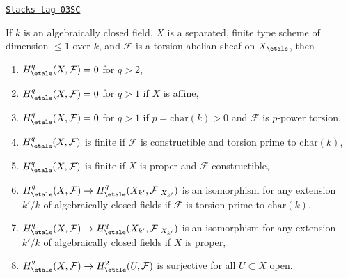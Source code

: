 \begin{theorem}
\label{etale-cohomology-theorem-vanishing-affine-curves}
\href{https://stacks.math.columbia.edu/tag/03SC}{\texttt{Stacks tag 03SC}}

If $k$ is an algebraically closed field, $X$ is a separated, finite type
scheme of dimension $\leq 1$ over $k$, and $\mathcal{F}$ is a torsion
abelian sheaf on $X_\etale$, then
\begin{enumerate}
\item
$H^q_\etale(X, \mathcal{F}) = 0$ for $q > 2$,
\item
$H^q_\etale(X, \mathcal{F}) = 0$ for $q > 1$ if $X$ is affine,
\item
$H^q_\etale(X, \mathcal{F}) = 0$ for $q > 1$ if $p = \text{char}(k) > 0$
and $\mathcal{F}$ is $p$-power torsion,
\item
$H^q_\etale(X, \mathcal{F})$ is finite if $\mathcal{F}$ is
constructible and torsion prime to $\text{char}(k)$,
\item
$H^q_\etale(X, \mathcal{F})$ is finite if $X$ is proper and
$\mathcal{F}$ constructible,
\item
$H^q_\etale(X, \mathcal{F}) \to
H^q_\etale(X_{k'}, \mathcal{F}|_{X_{k'}})$ is an isomorphism
for any extension $k'/k$ of algebraically closed fields
if $\mathcal{F}$ is torsion prime to $\text{char}(k)$,
\item
$H^q_\etale(X, \mathcal{F}) \to
H^q_\etale(X_{k'}, \mathcal{F}|_{X_{k'}})$ is an isomorphism
for any extension $k'/k$ of algebraically closed fields
if $X$ is proper,
\item
$H^2_\etale(X, \mathcal{F}) \to H^2_\etale(U, \mathcal{F})$
is surjective for all $U \subset X$ open.
\end{enumerate}
\end{theorem}

